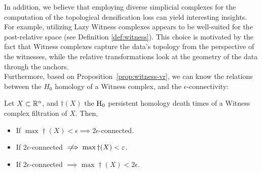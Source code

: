 \documentclass[../main.tex]{subfiles}
\begin{document}
In addition, we believe that employing diverse simplicial complexes for the computation of the topological densification loss can yield interesting insights. For example, utilizing Lazy Witness complexes appears to be well-suited for the post-relative space (see Definition \ref{def:witness}). This choice is motivated by the fact that Witness complexes capture the data's topology from the perspective of the witnesses, while the relative transformations look at the geometry of the data through the anchors.\\

Furthermore, based on Proposition~\ref{prop:witness-vr}, we can know the relations between the $H_0$ homology of a Witness complex, and the $\epsilon$-connectivity:
\begin{corollary}
Let $X\subset \mathbb{R}^n$, and $\dag(X)$ the $\text{\rm H}_0$ persistent homology death times of a Witness complex filtration of $X$. Then,
\begin{itemize}
    \item If $\max \dag(X) < \epsilon \implies 2\epsilon$-connected.
    \item If $2\epsilon$-connected $\notimplies \max \dag(X) < \epsilon$.
    \item If $2\epsilon$-connected $\implies \max \dag(X) < 2\epsilon$.
\end{itemize}
\end{corollary}
\end{document}
